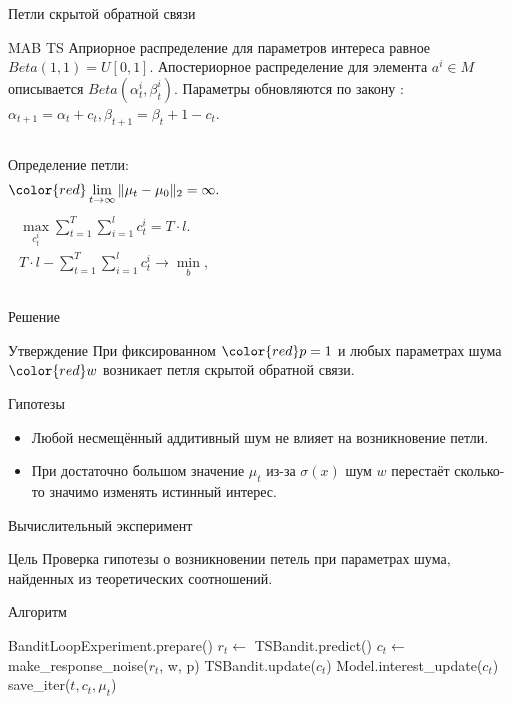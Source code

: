 \documentclass{beamer}
\begin{document}
\begin{frame}{Петли скрытой обратной связи}
  \begin{block}{MAB TS}
Априорное распределение для параметров интереса равное $Beta(1, 1) = U[0, 1]$. 
Апостериорное распределение для элемента $a^i \in M$ описывается $Beta(\alpha_t^i, \beta_t^i)$. 
Параметры обновляются по закону :
$\alpha_{t+1} = \alpha_t + c_t, \beta_{t+1} = \beta_t + 1 - c_t$.
\end{block}
\begin{columns}[c]
  Определение петли:
\begin{gather*}
  \color{red} \lim_{t \to \infty} \|\mu_t - \mu_0 \|_2 = \infty.
\end{gather*}
\begin{gather*}  
\max_{c_t^i} \sum_{t = 1}^T \sum_{i = 1}^l c_t^i = T \cdot l.\\ 
   T \cdot l - \sum_{t = 1}^T \sum_{i = 1}^l c_t^i \to \min_{b}, 
\end{gather*}
\end{columns}
\end{frame}
\begin{frame}{Решение}
  \begin{block}{Утверждение}
    При фиксированном $\color{red} p = 1$ и любых параметрах шума $\color{red} w$ возникает петля скрытой обратной связи. 
  \end{block}
  \begin{block}{Гипотезы}
  \begin{itemize}
      \item Любой несмещённый аддитивный шум не влияет на возникновение петли. 
      \item При достаточно большом значение $\mu_t$ из-за $\sigma (x)$ шум $w$ перестаёт сколько-то значимо изменять истинный интерес. 
  \end{itemize}
  \end{block}
\end{frame}
\begin{frame}{Вычислительный эксперимент}
\begin{block}{Цель}
Проверка гипотезы о возникновении петель при параметрах шума, найденных из теоретических соотношений. 
\end{block}

\begin{block}{Алгоритм}
\begin{algorithmic}
  \STATE BanditLoopExperiment.prepare()
    \STATE $r_t \leftarrow$ TSBandit.predict()
    \STATE $c_t \leftarrow$ make\_response\_noise($r_t$, w, p)
    \STATE TSBandit.update($c_t$)
    \STATE Model.interest\_update($c_t$)
    \STATE save\_iter($t, c_t, \mu_t$)
  \ENDFOR
\end{algorithmic}
\end{block}

\end{frame}
\end{document}
